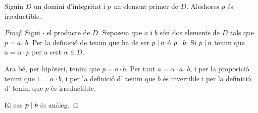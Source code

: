 \documentclass[../Apunts.tex]{subfiles}
\begin{document}
	\begin{proposition}
		Siguin \(D\) un domini d'integritat i \(p\) un element primer de \(D\). Aleshores \(p\) és irreductible.
		\begin{proof}
			Sigui \(\cdot\) el producte de \(D\). Suposem que \(a\) i \(b\) són dos elements de \(D\) tals que \(p=a\cdot b\). Per la definició de  tenim que ha de ser \(p\mathrel{|} a\) ó \(p\mathrel{|} b\). Si \(p\mathrel{|} a\) tenim que \(a=\alpha\cdot p\) per a cert \(\alpha\in D\).
			
			Ara bé, per hipòtesi, tenim que \(p=a\cdot b\). Per tant \(a=\alpha\cdot a\cdot b\), i per la proposició  tenim que \(1=\alpha\cdot b\), i per la definició d' tenim que \(b\) és invertible i per la definició d' tenim que \(p\) és irreductible.
			
			El cas \(p\mathrel{|} b\) és anàleg.
		\end{proof}
	\end{proposition}
\end{document}
